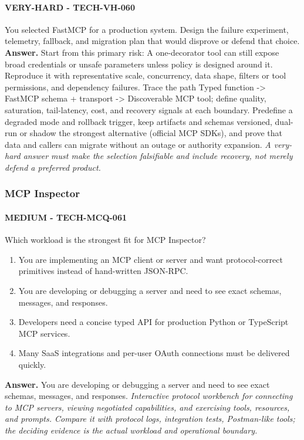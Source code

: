 \paragraph{VERY-HARD - TECH-VH-060} You selected FastMCP for a production system. Design the failure experiment, telemetry, fallback, and migration plan that would disprove or defend that choice.
\textbf{Answer.} Start from this primary risk: A one-decorator tool can still expose broad credentials or unsafe parameters unless policy is designed around it. Reproduce it with representative scale, concurrency, data shape, filters or tool permissions, and dependency failures. Trace the path Typed function -> FastMCP schema + transport -> Discoverable MCP tool; define quality, saturation, tail-latency, cost, and recovery signals at each boundary. Predefine a degraded mode and rollback trigger, keep artifacts and schemas versioned, dual-run or shadow the strongest alternative (official MCP SDKs), and prove that data and callers can migrate without an outage or authority expansion.
\textit{A very-hard answer must make the selection falsifiable and include recovery, not merely defend a preferred product.}
\subsubsection*{MCP Inspector}
\paragraph{MEDIUM - TECH-MCQ-061} Which workload is the strongest fit for MCP Inspector?
\begin{enumerate}[label=\Alph*.]
\item You are implementing an MCP client or server and want protocol-correct primitives instead of hand-written JSON-RPC.
\item You are developing or debugging a server and need to see exact schemas, messages, and responses.
\item Developers need a concise typed API for production Python or TypeScript MCP services.
\item Many SaaS integrations and per-user OAuth connections must be delivered quickly.
\end{enumerate}
\textbf{Answer.} You are developing or debugging a server and need to see exact schemas, messages, and responses.
\textit{Interactive protocol workbench for connecting to MCP servers, viewing negotiated capabilities, and exercising tools, resources, and prompts. Compare it with protocol logs, integration tests, Postman-like tools; the deciding evidence is the actual workload and operational boundary.}
